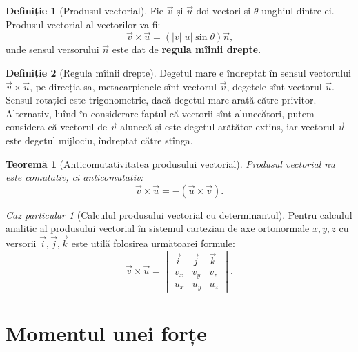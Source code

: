 \documentclass[a4paper]{article}
\theoremstyle{definition}
\newtheorem{definition}{Definiție}[section]
\theoremstyle{plain}%
\newtheorem{theorem}{Teoremă}[section]
\theoremstyle{remark}
\newtheorem{case}{Caz particular}
\begin{document}
\begin{definition}[Produsul vectorial]
	Fie \(\vec{v}\) și \(\vec{u}\) doi vectori și \(\theta\) unghiul dintre ei. Produsul vectorial al vectorilor va fi:
	\begin{equation*}
		\vec{v} \times \vec{u} = (\left|v\right| \left|u\right| \sin \theta) \vec n \text{,}
	\end{equation*}
	unde sensul versorului \(\vec n\) este dat de \textbf{regula mîinii drepte}.
\end{definition}

\begin{definition}[Regula mîinii drepte]
	Degetul mare e îndreptat în sensul vectorului \(\vec v \times \vec u\), pe direcția sa, metacarpienele sînt vectorul \(\vec v\), degetele sînt vectorul \(\vec u\). Sensul rotației este trigonometric, dacă degetul mare arată către privitor. Alternativ, luînd în considerare faptul că vectorii sînt alunecători, putem considera că vectorul de \(\vec v\) alunecă și este degetul arătător extins, iar vectorul \(\vec u\) este degetul mijlociu, îndreptat către stînga.
\end{definition}

\begin{theorem}[Anticomutativitatea produsului vectorial]
	Produsul vectorial nu este comutativ, ci anticomutativ:
	\begin{equation*}
		\vec v \times \vec u = - (\vec u \times \vec v) \text{.}
	\end{equation*}
\end{theorem}

\begin{case}[Calculul produsului vectorial cu determinantul]
	Pentru calculul analitic al produsului vectorial în sistemul cartezian de axe ortonormale \(x, y, z\) cu versorii \(\vec i, \vec j, \vec k\) este utilă folosirea următoarei formule:
	\begin{equation*}
		\vec v \times \vec u =
		\begin{vmatrix}
			\vec i & \vec j & \vec k \\
			v_x    & v_y    & v_z    \\
			u_x    & u_y    & u_z
		\end{vmatrix} \text{.}
	\end{equation*}
\end{case}

\section{Momentul unei forțe}
\end{document}
